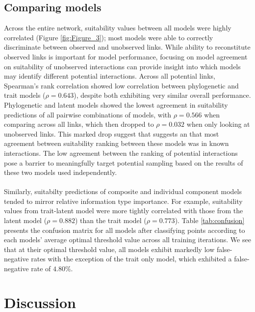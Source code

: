 \documentclass[openacc]{rsproca_new}%
\begin{document}
\subsection*{Comparing models}
Across the entire network, suitability values between all models were highly correlated (Figure \ref{fig:Figure_3}); most models were able to correctly discriminate between observed and unobserved links. While ability to reconstitute observed links is important for model performance, focusing on model agreement on suitability of unobserved interactions can provide insight into which models may identify different potential interactions. Across all potential links, Spearman's rank correlation showed low correlation between phylogenetic and trait models ($\rho = 0.643$), despite both exhibiting very similar overall performance. Phylogenetic and latent models showed the lowest agreement in suitability predictions of all pairwise combinations of models, with $\rho = 0.566$ when comparing across all links, which then dropped to $\rho = 0.032$ when only looking at unobserved links. This marked drop suggest that suggests an that most agreement between suitability ranking between these models was in known interactions. The low agreement between the ranking of potential interactions pose a barrier to meaningfully target potential sampling based on the results of these two models used independently.

\paragraph*{}
Similarly, suitabilty predictions of composite and individual component models tended to mirror relative information type importance. For example, suitability values from trait-latent model were more tightly correlated with those from the latent model ($\rho=0.882$) than the trait model ($\rho=0.773$). Table \ref{tab:confusion} presents the confusion matrix for all models after classifying points according to each models' average optimal threshold value across all training iterations. We see that at their optimal threshold value, all models exhibit markedly low false-negative rates with the exception of the trait only model, which exhibited a false-negative rate of $4.80\%$.








\section*{Discussion}
\end{document}
